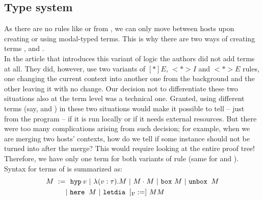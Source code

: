 \subsection{Type system}
As there are no rules like \fetchr{} or \getr{} from \langL{}, we can only move between hosts upon creating or using modal-typed terms. This is why there are two ways of creating terms \heree{}, \unboxe{} and . \\
In the article\cite{labelfree} that introduces this variant of \logic{} logic the authors did not add terms at all. They did, however, use two variants of $[*]E$, $<*>I$ and $<*>E$ rules, one changing the current context into another one from the background and the other leaving it with no change. Our decision not to differentiate these two situations also at the term level was a technical one. Granted, using different terms (say, \unboxe{} and \unboxfetche{}) in these two situations would make it possible to tell -- just from the program -- if it is run locally or if it needs external resources. But there were too many complications arising from such decision; for example, when we are merging two hosts' contexts, how do we tell if some \unboxfetche{} instance should not be turned into \unbox{} after the merge? This would require looking at the entire proof tree! Therefore, we have only one term for both variants of \unboxr{} rule (same for \herer{} and ).\\

Syntax for terms of \langLF{} is summarized as:
\begin{align*}
M ~:=&~~ \hyp {\varbr} ~|~ \lam{\varbr{}}{\tau} M ~|~ \appl{M}{M} ~|~ \bboxe{}\ M ~|~ \unbox{} M \\
	&|~ \here M ~|~ \letdia {\varbr{}}{} {M} {M}
\end{align*}


